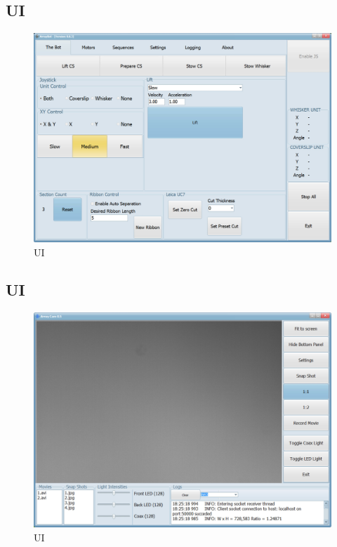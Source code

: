 \documentclass[11pt,fleqn]{book} %
\begin{document}
\subsection{\ab{} UI}

\begin{figure}
\centering\includegraphics[scale=0.85]{AB_UI_1}
\caption{\ab{} UI}
\end{figure}

\clearpage

\subsection{\ac{} UI}

\begin{figure}
\centering\includegraphics[scale=0.85]{AC_UI_1}
\caption{\ac{} UI}
\end{figure}
\end{document}
